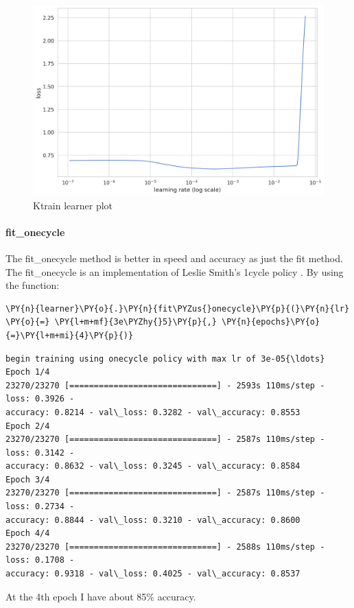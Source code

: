 \begin{figure}[ht!]
\centering
\includegraphics[width=1\textwidth]{images/output_97_0.png}
\caption{\gls{Ktrain} learner plot}
\label{fig:fig_29}
\end{figure}
\FloatBarrier

\paragraph{fit\_onecycle}
The fit\_onecycle method is better in speed and \gls{accuracy} as just the fit method.
The fit\_onecycle is an implementation of Leslie Smith’s 1cycle policy \cite{smith_disciplined_2018}.
By using the function:
    \begin{tcolorbox}[breakable, size=fbox, boxrule=1pt, pad at break*=1mm,colback=cellbackground, colframe=cellborder]
\begin{Verbatim}[commandchars=\\\{\},fontsize=\footnotesize]
\PY{n}{learner}\PY{o}{.}\PY{n}{fit\PYZus{}onecycle}\PY{p}{(}\PY{n}{lr} \PY{o}{=} \PY{l+m+mf}{3e\PYZhy{}5}\PY{p}{,} \PY{n}{epochs}\PY{o}{=}\PY{l+m+mi}{4}\PY{p}{)}
\end{Verbatim}
\end{tcolorbox}

 \begin{Verbatim}[commandchars=\\\{\},fontsize=\footnotesize]
begin training using onecycle policy with max lr of 3e-05{\ldots}
Epoch 1/4
23270/23270 [==============================] - 2593s 110ms/step - loss: 0.3926 -
accuracy: 0.8214 - val\_loss: 0.3282 - val\_accuracy: 0.8553
Epoch 2/4
23270/23270 [==============================] - 2587s 110ms/step - loss: 0.3142 -
accuracy: 0.8632 - val\_loss: 0.3245 - val\_accuracy: 0.8584
Epoch 3/4
23270/23270 [==============================] - 2587s 110ms/step - loss: 0.2734 -
accuracy: 0.8844 - val\_loss: 0.3210 - val\_accuracy: 0.8600
Epoch 4/4
23270/23270 [==============================] - 2588s 110ms/step - loss: 0.1708 -
accuracy: 0.9318 - val\_loss: 0.4025 - val\_accuracy: 0.8537
    \end{Verbatim}
At the 4th epoch I have about 85\% \gls{accuracy}.

